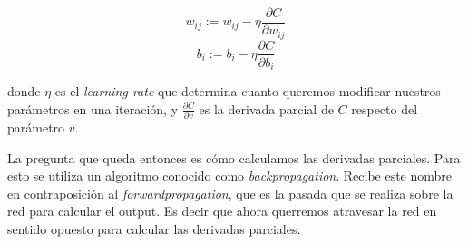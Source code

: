 $$w_{ij} := w_{ij} - \eta \frac{\partial C}{\partial w_{ij}}$$
$$b_i := b_i - \eta \frac{\partial C}{\partial b_i}$$

donde $\eta$ es el \emph{learning rate} que determina cuanto queremos modificar nuestros parámetros en una iteración, y $\frac{\partial C}{\partial v}$ es la derivada parcial de $C$ respecto del parámetro $v$.

La pregunta que queda entonces es cómo calculamos las derivadas parciales. Para esto se utiliza un algoritmo conocido como \emph{backpropagation}. Recibe este nombre en contraposición al \emph{forwardpropagation}, que es la pasada que se realiza sobre la red para calcular el output. Es decir que ahora querremos atravesar la red en sentido opuesto para calcular las derivadas parciales.
